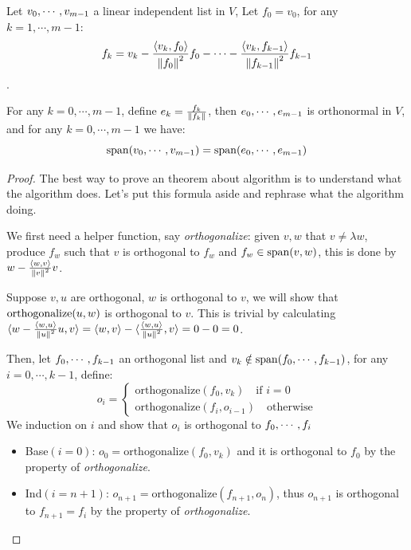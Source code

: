\documentclass[../main.tex]{subfiles}
\begin{document}
\setcounter{section}{6}

\setcounter{theorem}{31}
\begin{theorem}
  Let $v_0 , \cdots , v_{m - 1}$ a linear independent list in $V$, Let $f_0 = v_0$,
  for any $k = 1, \cdots, m - 1$:
  \[
    f_k = v_k - \frac{\langle v_k , f_0\rangle}{\left\Vert f_0 \right\Vert^2}f_0 - \cdots -\frac{\langle v_k , f_{k - 1}\rangle}{\left\Vert f_{k - 1} \right\Vert^2}f_{k - 1}
  \].

  For any $k = 0, \cdots, m - 1$, define $e_k = \frac{f_k}{\left\Vert f_k \right\Vert}$,
  then $e_0 , \cdots , e_{m - 1}$ is orthonormal in $V$, and for any $k = 0, \cdots, m - 1$
  we have:
  \[
  \operatorname{span}(v_0 , \cdots , v_{m - 1}) = \operatorname{span}(e_0 , \cdots , e_{m - 1})
  \]
\end{theorem}
\begin{proof}
  The best way to prove an theorem about algorithm is to understand what the algorithm
  does. Let's put this formula aside and rephrase what the algorithm doing. 
  
  We first need a helper function, say \textit{orthogonalize}: given $v, w$ that $v \neq \lambda w$,
  produce $f_w$ such that $v$ is orthogonal to $f_w$ and $f_w \in \operatorname{span}(v, w)$,
  this is done by $w - \frac{\langle w , v\rangle}{\left\Vert v \right\Vert^2}v$.

  Suppose $v, u$ are orthogonal, $w$ is orthogonal to $v$, we will show that
  $\textnormal{orthogonalize}(u, w)$ is orthogonal to $v$. This is trivial by calculating
  $\langle w - \frac{\langle w , u\rangle}{\left\Vert u \right\Vert^2}u , v\rangle = \langle w , v\rangle - \langle \frac{\langle w , u\rangle}{\left\Vert u \right\Vert^2} , v\rangle = 0 - 0 = 0$.

  Then, let $f_0 , \cdots , f_{k - 1}$ an orthogonal list and $v_k \notin \operatorname{span}(f_0 , \cdots , f_{k - 1})$,
  for any $i = 0, \cdots, k - 1$, define:
  \[
  o_i = \begin{cases}  
    \mathrm{orthogonalize}(f_0, v_k) \quad \text{if } i = 0 \\
    \mathrm{orthogonalize}(f_i, o_{i - 1}) \quad \text{otherwise}
  \end{cases}
  \]
  We induction on $i$ and show that $o_i$ is orthogonal to $f_0 , \cdots , f_{i}$
  \begin{itemize}
    \item Base$(i = 0)$: $o_0 = \mathrm{orthogonalize}(f_0, v_k)$ and it is orthogonal to $f_0$ by the property of \textit{orthogonalize}.
    \item Ind$(i = n + 1)$: $o_{n + 1} = \mathrm{orthogonalize}(f_{n + 1}, o_n)$, 
          thus $o_{n + 1}$ is orthogonal to $f_{n + 1} = f_i$ by the property of \textit{orthogonalize}.


\end{itemize}
\end{proof}
\end{document}

